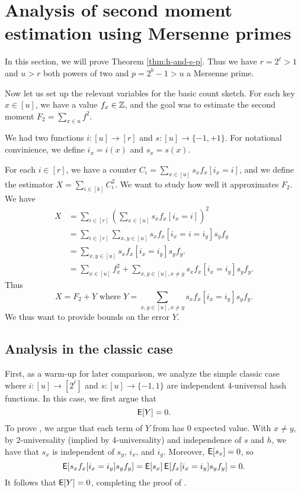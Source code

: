 


\section{Analysis of second moment estimation using  Mersenne primes}\label{sec:analysis-two-for-one}
In this section, we will prove Theorem \ref{thm:h-and-s-p}.  Thus we
have $r=2^\ell>1$ and $u>r$ both powers of two and $p=2^b-1>u$ a
Mersenne prime.

Now let us set up the relevant variables for the basic count sketch.
For each key $x\in [u]$, we have a value $f_x\in \mathbb Z$, and the
goal was to estimate the second moment $F_2=\sum_{x\in u}f^2$.

We had two functions $i:[u]\to[r]$ and $s:[u]\to\{-1,+1\}$. 
For notational convinience, we define $i_x=i(x)$ and $s_x=s(x)$.

For each $i\in [r]$, we have a counter 
$C_i=\sum_{x\in[u]} s_x f_x[i_x=i]$, and we define the 
estimator $X=\sum_{i\in[k]} C_i^2$. We want to study how
well it approximates $F_2$.
We have 
\begin{align*}
X&=\sum_{i\in[r]}\left( \sum_{x\in[u]}s_x f_x[i_x=i]\right)^2\\
&=\sum_{i\in[r]}\sum_{x,y\in[u]}s_x f_x[i_x=i=i_y]s_y f_y\\
&=\sum_{x,y\in[u]}s_x f_x[i_x=i_y]s_y f_y.\\
&=\sum_{x\in[u]} f_x^2+\sum_{x,y\in[u],x\neq y}
s_x f_x[i_x=i_y]s_y f_y.
\end{align*}
Thus 
\begin{equation}\label{eq:decomp}
X=F_2+Y\mbox{ where }Y=\sum_{x,y\in[u],x\neq y}
s_x f_x[i_x=i_y]s_y f_y.
\end{equation}
We thus want to provide bounds on the error $Y$.

\subsection{Analysis in the classic case}
First, as a warm-up for later comparison, we analyze the simple classic case
where $i:[u]\to[2^\ell]$ and
$s:[u]\to\{-1,1\}$ are independent 4-universal hash
functions. In this case, we first argue that 
\begin{equation}\label{eq:mean}
\operatorname*{\sf{E}}[Y]=0.
\end{equation}
To prove , we argue that each term of
$Y$ from  has 0 expected value. With $x\neq y$, by 2-universality (implied by 4-universality) and independence of $s$ and $h$, we have that $s_x$ is independent of $s_y$, $i_x$, and $i_y$.
Moreover, $\operatorname*{\sf{E}}[s_x]=0$, 
so 
\[\operatorname*{\sf{E}}[s_x f_x[i_x=i_y]s_y f_y]=\operatorname*{\sf{E}}[s_x]\operatorname*{\sf{E}}[f_x[i_x=i_y]s_y f_y]=0.\]
It follows that $\operatorname*{\sf{E}}[Y]=0$, completing the proof of .

